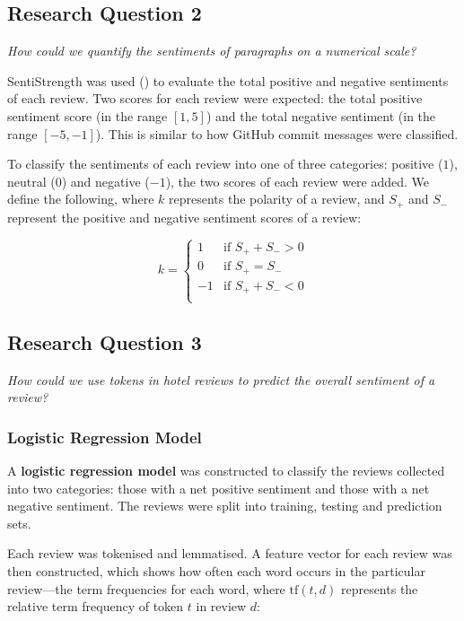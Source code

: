 \documentclass[12pt, bibliography=totocnumbered, paper=a4]{scrartcl}
\def\bf#1{\textbf{#1}}
\def\it#1{\textit{#1}}
\begin{document}
\subsection{Research Question 2}
\it{How could we quantify the sentiments of paragraphs on a numerical scale?}

SentiStrength was used (\cite{github}) to evaluate the total positive %
and negative sentiments of each review. Two scores for each review were expected:
the total positive sentiment score (in the range \([1, 5]\)) and the total negative
sentiment (in the range \([-5, -1]\)). This is similar to how GitHub commit
messages were classified.

To classify the sentiments of each review into one of three categories:
positive (\(1\)), neutral (\(0\)) and negative (\(-1\)), the two scores of each review
were added. We define the following, where \(k\) represents the polarity of a review,
and \(S_+\) and \(S_-\) represent the positive and negative sentiment scores of a review:

\begin{equation}
	k = \begin{cases}
		1  & \text{if } S_+ + S_- > 0 \\
		0  & \text{if } S_+ = S_-     \\
		-1 & \text{if } S_+ + S_- < 0 \\
	\end{cases}
	\label{eq:polarity}
\end{equation}

\subsection{Research Question 3}
\it{How could we use tokens in hotel reviews to predict the overall sentiment of a review?}

\subsubsection{Logistic Regression Model}
A \bf{logistic regression model} was constructed to classify the reviews collected into
two categories: those with a net positive sentiment and those with a net negative sentiment.
The reviews were split into training, testing and prediction sets.

Each review was tokenised and lemmatised. A feature vector for each review was
then constructed, which shows how often each word occurs in the particular review---the
term frequencies for each word, where \(\text{tf}(t,d)\) represents the relative term frequency of
token \(t\) in review \(d\):
\end{document}
